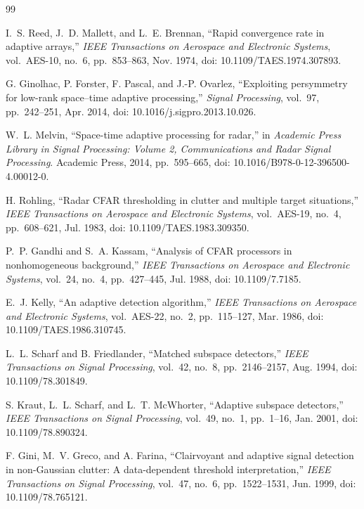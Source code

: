 \documentclass[journal]{IEEEtran}
\begin{document}
\begin{thebibliography}{99}

I.~S. Reed, J.~D. Mallett, and L.~E. Brennan, ``Rapid convergence rate in adaptive arrays,'' \emph{IEEE Transactions on Aerospace and Electronic Systems}, vol.~AES-10, no.~6, pp.~853--863, Nov. 1974, doi: 10.1109/TAES.1974.307893.

G. Ginolhac, P. Forster, F. Pascal, and J.-P. Ovarlez, ``Exploiting persymmetry for low-rank space--time adaptive processing,'' \emph{Signal Processing}, vol.~97, pp.~242--251, Apr. 2014, doi: 10.1016/j.sigpro.2013.10.026.

W.~L. Melvin, ``Space-time adaptive processing for radar,'' in \emph{Academic Press Library in Signal Processing: Volume 2, Communications and Radar Signal Processing}. Academic Press, 2014, pp.~595--665, doi: 10.1016/B978-0-12-396500-4.00012-0.

H. Rohling, ``Radar CFAR thresholding in clutter and multiple target situations,'' \emph{IEEE Transactions on Aerospace and Electronic Systems}, vol.~AES-19, no.~4, pp.~608--621, Jul. 1983, doi: 10.1109/TAES.1983.309350.

P.~P. Gandhi and S.~A. Kassam, ``Analysis of CFAR processors in nonhomogeneous background,'' \emph{IEEE Transactions on Aerospace and Electronic Systems}, vol.~24, no.~4, pp.~427--445, Jul. 1988, doi: 10.1109/7.7185.

E.~J. Kelly, ``An adaptive detection algorithm,'' \emph{IEEE Transactions on Aerospace and Electronic Systems}, vol.~AES-22, no.~2, pp.~115--127, Mar. 1986, doi: 10.1109/TAES.1986.310745.

L.~L. Scharf and B. Friedlander, ``Matched subspace detectors,'' \emph{IEEE Transactions on Signal Processing}, vol.~42, no.~8, pp.~2146--2157, Aug. 1994, doi: 10.1109/78.301849.

S. Kraut, L.~L. Scharf, and L.~T. McWhorter, ``Adaptive subspace detectors,'' \emph{IEEE Transactions on Signal Processing}, vol.~49, no.~1, pp.~1--16, Jan. 2001, doi: 10.1109/78.890324.

F. Gini, M.~V. Greco, and A. Farina, ``Clairvoyant and adaptive signal detection in non-Gaussian clutter: A data-dependent threshold interpretation,'' \emph{IEEE Transactions on Signal Processing}, vol.~47, no.~6, pp.~1522--1531, Jun. 1999, doi: 10.1109/78.765121.


\end{thebibliography}
\end{document}
